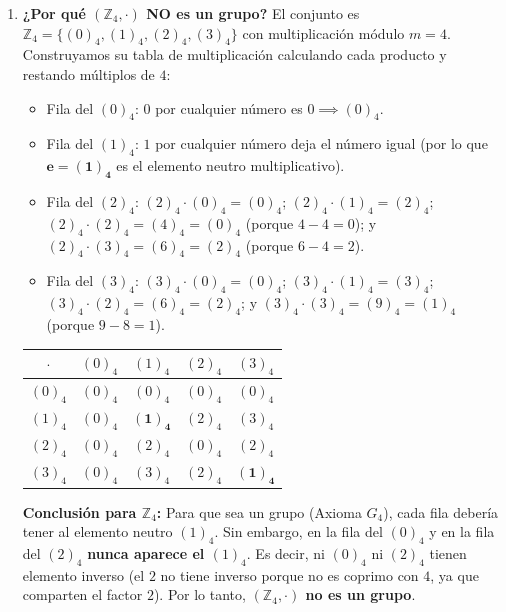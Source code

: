 \documentclass[11pt, a4paper]{article}
\begin{document}
\begin{enumerate}
    \item \textbf{¿Por qué $(\mathbb{Z}_4, \cdot)$ NO es un grupo?}
    El conjunto es $\mathbb{Z}_4 = \{(0)_4, (1)_4, (2)_4, (3)_4\}$ con multiplicación módulo $m = 4$. Construyamos su tabla de multiplicación calculando cada producto y restando múltiplos de $4$:
    \begin{itemize}
        \item Fila del $(0)_4$: $0$ por cualquier número es $0 \implies (0)_4$.
        \item Fila del $(1)_4$: $1$ por cualquier número deja el número igual (por lo que $\mathbf{e = (1)_4}$ es el elemento neutro multiplicativo).
        \item Fila del $(2)_4$: $(2)_4 \cdot (0)_4 = (0)_4$; $(2)_4 \cdot (1)_4 = (2)_4$; $(2)_4 \cdot (2)_4 = (4)_4 = (0)_4$ (porque $4 - 4 = 0$); y $(2)_4 \cdot (3)_4 = (6)_4 = (2)_4$ (porque $6 - 4 = 2$).
        \item Fila del $(3)_4$: $(3)_4 \cdot (0)_4 = (0)_4$; $(3)_4 \cdot (1)_4 = (3)_4$; $(3)_4 \cdot (2)_4 = (6)_4 = (2)_4$; y $(3)_4 \cdot (3)_4 = (9)_4 = (1)_4$ (porque $9 - 8 = 1$).
    \end{itemize}
    \begin{center}
    \begin{tabular}{c|cccc}
    $\cdot$ & $(0)_4$ & $(1)_4$ & $(2)_4$ & $(3)_4$ \\
    \hline
    $(0)_4$ & $(0)_4$ & $(0)_4$ & $(0)_4$ & $(0)_4$ \\
    $(1)_4$ & $(0)_4$ & $\mathbf{(1)_4}$ & $(2)_4$ & $(3)_4$ \\
    $(2)_4$ & $(0)_4$ & $(2)_4$ & $(0)_4$ & $(2)_4$ \\
    $(3)_4$ & $(0)_4$ & $(3)_4$ & $(2)_4$ & $\mathbf{(1)_4}$
    \end{tabular}
    \end{center}
    \textbf{Conclusión para $\mathbb{Z}_4$:} Para que sea un grupo (Axioma $G_4$), cada fila debería tener al elemento neutro $(1)_4$. Sin embargo, en la fila del $(0)_4$ y en la fila del $(2)_4$ \textbf{nunca aparece el $(1)_4$}. Es decir, ni $(0)_4$ ni $(2)_4$ tienen elemento inverso (el $2$ no tiene inverso porque no es coprimo con $4$, ya que comparten el factor $2$). Por lo tanto, \textbf{$(\mathbb{Z}_4, \cdot)$ no es un grupo}.


\end{enumerate}
\end{document}
